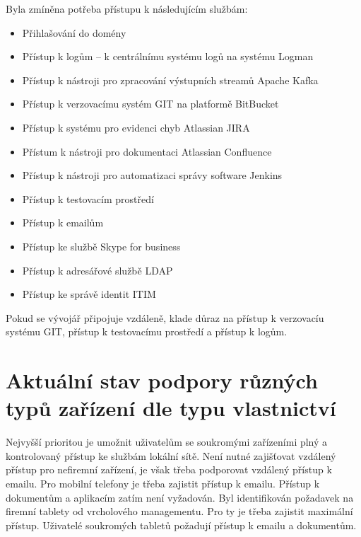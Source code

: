 Byla zmíněna potřeba přístupu k následujícím službám:
\begin{itemize}
    \item Přihlašování do domény
    \item Přístup k logům -- k centrálnímu systému logů na systému Logman
    \item Přístup k nástroji pro zpracování výstupních streamů Apache Kafka
    \item Přístup k verzovacímu systém GIT na platformě BitBucket
    \item Přístup k systému pro evidenci chyb Atlassian JIRA
    \item Přístum k nástroji pro dokumentaci Atlassian Confluence
    \item Přístup k nástroji pro automatizaci správy software Jenkins
    \item Přístup k testovacím prostředí
    \item Přístup k emailům 
    \item Přístup ke službě Skype for business
    \item Přístup k adresářové službě LDAP
    \item Přístup ke správě identit ITIM
\end{itemize}

Pokud se vývojář připojuje vzdáleně, klade důraz na přístup k verzovacíu systému GIT, přístup k testovacímu prostředí a přístup k logům.

\section{Aktuální stav podpory různých typů zařízení dle typu vlastnictví}


Nejvyšší prioritou je umožnit uživatelům se soukromými zařízeními plný a kontrolovaný přístup ke službám lokální sítě. Není nutné zajišťovat vzdálený přístup pro nefiremní zařízení, je však třeba podporovat vzdálený přístup k emailu. Pro mobilní telefony je třeba zajistit přístup k emailu. Přístup k dokumentům a aplikacím zatím není vyžadován. Byl identifikován požadavek na firemní tablety od vrcholového managementu. Pro ty je třeba zajistit maximální přístup. Uživatelé soukromých tabletů požadují přístup k emailu a dokumentům.

